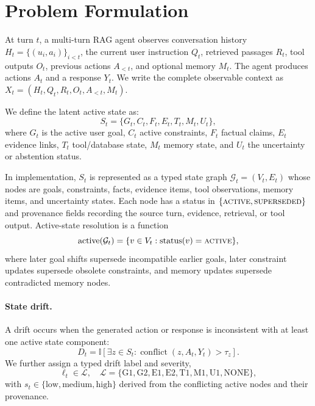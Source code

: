 \documentclass[letterpaper]{article}
\begin{document}
\section{Problem Formulation}

At turn $t$, a multi-turn RAG agent observes conversation history $H_t=\{(u_i,a_i)\}_{i<t}$, the current user instruction $Q_t$, retrieved passages $R_t$, tool outputs $O_t$, previous actions $A_{<t}$, and optional memory $M_t$. The agent produces actions $A_t$ and a response $Y_t$. We write the complete observable context as $X_t=(H_t,Q_t,R_t,O_t,A_{<t},M_t)$.

We define the latent active state as:
\begin{equation}
S_t = \{G_t, C_t, F_t, E_t, T_t, M_t, U_t\},
\end{equation}
where $G_t$ is the active user goal, $C_t$ active constraints, $F_t$ factual claims, $E_t$ evidence links, $T_t$ tool/database state, $M_t$ memory state, and $U_t$ the uncertainty or abstention status.

In implementation, $S_t$ is represented as a typed state graph $\mathcal{G}_t=(V_t,E_t)$ whose nodes are goals, constraints, facts, evidence items, tool observations, memory items, and uncertainty states. Each node has a status in $\{\textsc{active},\textsc{superseded}\}$ and provenance fields recording the source turn, evidence, retrieval, or tool output. Active-state resolution is a function
\begin{equation}
\operatorname{active}(\mathcal{G}_t)=\{v\in V_t: \operatorname{status}(v)=\textsc{active}\},
\end{equation}
where later goal shifts supersede incompatible earlier goals, later constraint updates supersede obsolete constraints, and memory updates supersede contradicted memory nodes.

\paragraph{State drift.}
A drift occurs when the generated action or response is inconsistent with at least one active state component:
\begin{equation}
D_t = \mathbb{I}\left[\exists z \in S_t: \operatorname{conflict}(z, A_t, Y_t) > \tau_z\right].
\end{equation}
We further assign a typed drift label and severity,
\begin{equation}
\ell_t \in \mathcal{L}, \quad
\mathcal{L}=\{\mathrm{G1},\mathrm{G2},\mathrm{E1},\mathrm{E2},\mathrm{T1},\mathrm{M1},\mathrm{U1},\mathrm{NONE}\},
\end{equation}
with $s_t\in\{\mathrm{low},\mathrm{medium},\mathrm{high}\}$ derived from the conflicting active nodes and their provenance.
\end{document}
